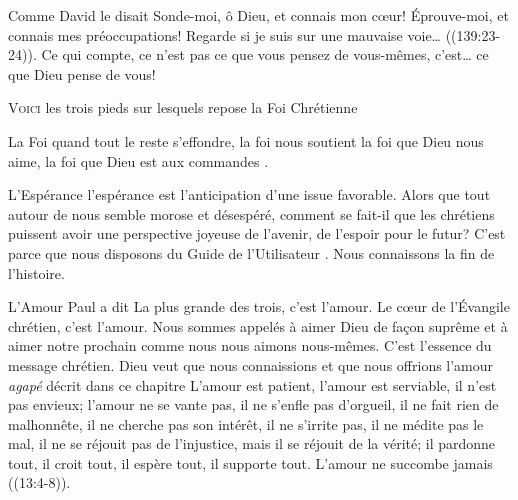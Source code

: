 Comme David le disait\frcolon{} 
 \Og Sonde-moi, ô Dieu, et connais mon c\oe{}ur!
 Éprouve-moi, et connais mes préoccupations!
 Regarde si je suis sur une mauvaise voie\dots{} \Fg{}
 ((139:23-24)).
 Ce qui compte, ce n'est pas ce que vous pensez de vous-mêmes,
 c'est\dots{} ce que Dieu pense de vous!

\dvrule








\lettrine[lhang=0.8]{V}{oici} les trois pieds sur lesquels
 repose la Foi Chrétienne\frcolon{}

La Foi \ocadr quand tout le reste s'effondre, la foi nous soutient \fcadr{}
 la foi que Dieu nous aime, la foi que Dieu est \Og aux commandes \Fg{}.

L'Espérance \ocadr l'espérance est l'anticipation d'une issue favorable.
 Alors que tout autour de nous semble morose et désespéré,
 comment se fait-il que les chrétiens puissent avoir une perspective
 joyeuse de l'avenir, de l'espoir pour le futur?
 C'est parce que nous disposons du \Og Guide de l'Utilisateur \Fg.
 Nous connaissons la fin de l'histoire.


L'Amour \ocadr Paul a dit\frcolon{} 
 \Og La plus grande des trois, c'est l'amour. \Fg{}
 Le c\oe{}ur de l'Évangile chrétien, c'est l'amour.
 Nous sommes appelés à aimer Dieu de fa\c{c}on suprême
 et à aimer notre prochain comme nous nous aimons nous-mêmes.
 C'est l'essence du message chrétien.
 Dieu veut que nous connaissions et que nous offrions
 l'amour \emph{agapé}  décrit dans ce chapitre\frcolon{}
 \Og L'amour est patient, l'amour est serviable,
 il n'est pas envieux; l'amour ne se vante pas,
 il ne s'enfle pas d'orgueil, il ne fait rien de malhonnête,
 il ne cherche pas son intérêt, il ne s'irrite pas,
 il ne médite pas le mal, il ne se réjouit pas de l'injustice,
 mais il se réjouit de la vérité;
 il pardonne tout, il croit tout, il espère tout,
 il supporte tout. L'amour ne succombe jamais \Fg{}
 ((13:4-8)). 

